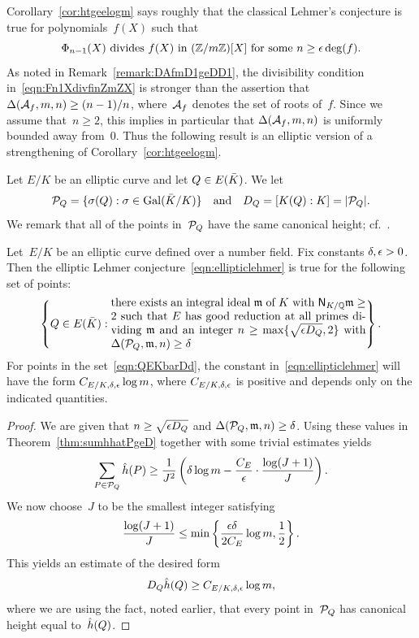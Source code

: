\documentclass[12pt,reqno]{amsart}
\begin{document}
Corollary~\ref{cor:htgeelogm} says roughly that the classical Lehmer's
conjecture is true for polynomials~$f(X)$ such that
\begin{equation}
  \label{eqn:Fn1XdivfinZmZX}
  \text{$\Phi_{n-1}(X)$ divides $f(X)$ in $(\mathbb{Z}/m\mathbb{Z})[X]$ for some
    $n\ge\epsilon\deg(f)$.}
\end{equation}
As noted in Remark~\ref{remark:DAfmD1geDD1}, the divisibility
condition in~\eqref{eqn:Fn1XdivfinZmZX} is stronger than the assertion
that $\Delta({\mathcal A}_f,m,n)\ge(n-1)/n$, where~${\mathcal A}_f$ denotes the set of
roots of~$f$. Since we assume that~$n\ge2$, this implies in particular
that $\Delta({\mathcal A}_f,m,n)$ is uniformly bounded away from~$0$.  Thus the
following result is an elliptic version of a strengthening of
Corollary~\ref{cor:htgeelogm}.

\begin{definition}
Let $E/K$ be an elliptic curve and let $Q\in E({\bar K})$. We let
\[
  {\mathcal P}_Q = \{\sigma(Q) : \sigma\in\operatorname{Gal}({\bar K}/K)\}
  \quad\text{and}\quad
  D_Q = [K(Q):K] = |{\mathcal P}_Q|.
\]
We remark that all of the points in~${\mathcal P}_Q$ have the same canonical
height; cf.~\cite[Theorem~VIII.5.10]{MR2514094}.
\end{definition}

\begin{corollary}
\label{cor:ellipticlehmer}
Let~$E/K$ be an elliptic curve defined over a number field.  Fix
constants $\delta,\epsilon>0$. Then the elliptic Lehmer
conjecture~\eqref{eqn:ellipticlehmer} is true for the
following set of points\textup:
\begin{equation}
  \label{eqn:QEKbarDd}
  \left\{ Q \in E(\Kbar) : 
   \parbox{.65\hsize}{\noindent
    there exists an integral ideal $\gm$ of $K$ 
    with $\Norm_{K/\QQ}\gm\ge2$ such that $E$ has
    good reduction at all primes dividing $\gm$ and
    an integer $n\ge\max\{\sqrt{\e D_Q},2\}$ 
    with $\D(\Pcal_Q,\gm,n)\ge\d$
  }
  \right\}.
\end{equation}
For points in the set~\eqref{eqn:QEKbarDd}, the constant
in~\eqref{eqn:ellipticlehmer} will have the form
$C_{E/K,\delta,\epsilon}\log{m}$, where $C_{E/K,\delta,\epsilon}$ is positive and depends
only on the indicated quantities.
\end{corollary}
\begin{proof}
We are given that $n\ge\sqrt{\epsilon D_Q}$ and $\Delta({\mathcal P}_Q,{\mathfrak{m}},n)\ge\delta$.
Using these values in Theorem~\ref{thm:sumhhatPgeD} together with
some trivial estimates yields
\[
  \sum_{P\in{\mathcal P}_Q}{\hat h}(P)
  \ge \frac{1}{J^2}\left(\delta\log m
           -\frac{C_E}{\epsilon}\cdot\frac{\log(J+1)}{J}\right).
\]
We now choose~$J$ to be the smallest integer satisfying
\[
  \frac{\log(J+1)}{J} \le \min\left\{ \frac{\epsilon\delta}{2C_E}\log m, \frac12\right\}.
\]
This yields  an estimate of the desired form
\[
  D_Q{\hat h}(Q) \ge C_{E/K,\delta,\epsilon}\log m,
\]
where we are using the fact, noted earlier, that every point in~${\mathcal P}_Q$
has canonical height equal to~${\hat h}(Q)$.
\end{proof}
\end{document}
